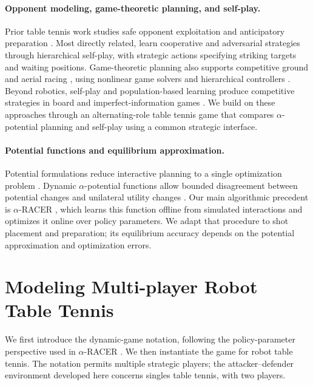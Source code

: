 \documentclass[pmlr]{jmlr}
\begin{document}
\paragraph{Opponent modeling, game-theoretic planning, and self-play.}
Prior table tennis work studies safe opponent exploitation and anticipatory preparation \citep{wang2011safe,wang2017anticipation}. Most directly related, \citet{mahjourian2018hierarchical} learn cooperative and adversarial strategies through hierarchical self-play, with strategic actions specifying striking targets and waiting positions. Game-theoretic planning also supports competitive ground and aerial racing \citep{wang2019racing,spica2020drone}, using nonlinear game solvers and hierarchical controllers \citep{fridovich2020ilqgames,zhu2024sqp,thakkar2024hierarchical}. Beyond robotics, self-play and population-based learning produce competitive strategies in board and imperfect-information games \citep{silver2018alphazero,heinrich2016nfsp,lanctot2017psro}. We build on these approaches through an alternating-role table tennis game that compares $\alpha$-potential planning and self-play using a common strategic interface.

\paragraph{Potential functions and equilibrium approximation.}
Potential formulations reduce interactive planning to a single optimization problem \citep{kavuncu2021potential,jia2023rapid}. Dynamic $\alpha$-potential functions allow bounded disagreement between potential changes and unilateral utility changes \citep{guo2023markov,guo2024dynamic}. Our main algorithmic precedent is $\alpha$-RACER \citep{kalaria2025racer}, which learns this function offline from simulated interactions and optimizes it online over policy parameters. We adapt that procedure to shot placement and preparation; its equilibrium accuracy depends on the potential approximation and optimization errors.

\section{Modeling Multi-player Robot Table Tennis}
\label{sec:model}

We first introduce the dynamic-game notation, following the policy-parameter perspective used in $\alpha$-RACER \citep{kalaria2025racer}. We then instantiate the game for robot table tennis. The notation permits multiple strategic players; the attacker--defender environment developed here concerns singles table tennis, with two players.
\end{document}
